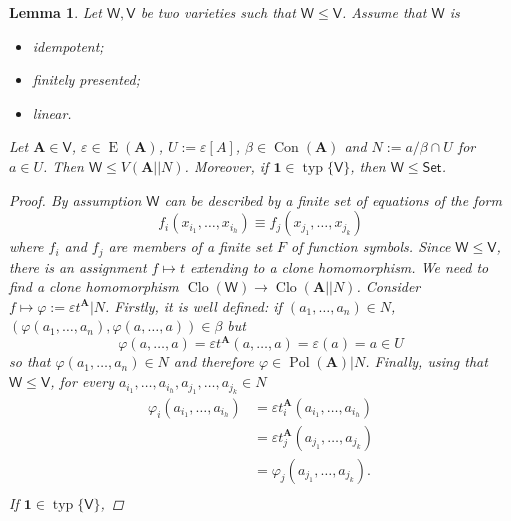 \documentclass{amsart}
\theoremstyle{plain}
\newtheorem{lemma}[theorem]{Lemma}
\theoremstyle{definition}
\theoremstyle{remark}
\def\phi{\varphi}
\def\epsilon{\varepsilon}
\DeclareMathOperator{\Clo}{Clo}
\DeclareMathOperator{\Con}{Con}
\DeclareMathOperator{\Pol}{Pol}
\DeclareMathOperator{\typ}{typ}
\DeclareMathOperator{\Id}{E}
\begin{document}
\begin{lemma}
    \label{lemma_type1}
    Let $\mathsf{W}, \mathsf{V}$ be two varieties such that $\mathsf{W} \le \mathsf{V}$. 
    Assume that $\mathsf{W}$ is 
    \begin{itemize}
        \item idempotent; 
        \item finitely presented; 
        \item linear. 
    \end{itemize}
    Let $\mathbf{A} \in \mathsf{V}$, $\epsilon \in \Id(\mathbf{A})$, $U:=\epsilon[A]$, $\beta \in \Con(\mathbf{A})$ and $N:=a/\beta \cap U$ for $a \in U$. 
    Then $\mathsf{W} \le V(\mathbf{A}||N)$. 
    Moreover, if $\mathbf{1} \in \typ\{\mathsf{V}\}$, then $\mathsf{W} \le \mathsf{Set}$. 
    \begin{proof}
        By assumption $\mathsf{W}$ can be described by a finite set of equations of the form 
        \begin{equation}
            f_i(x_{i_1}, \ldots, x_{i_h}) \equiv f_j(x_{j_1}, \ldots, x_{j_k})
        \end{equation}
        where $f_i$ and $f_j$ are members of a finite set $F$ of function symbols. 
        Since $\mathsf{W} \le  \mathsf{V}$, there is an assignment $f \mapsto t$ extending to a clone homomorphism. 
        We need to find a clone homomorphism $\Clo(\mathsf{W}) \to \Clo(\mathbf{A}||N)$. 
        Consider $f \mapsto \phi:=\epsilon t^\mathbf{A} |N$. 
        Firstly, it is well defined: if $(a_1, \ldots, a_n) \in N$, $(\phi(a_1, \ldots, a_n), \phi(a, \ldots, a)) \in \beta$ but 
        \begin{equation*}
            \phi(a, \ldots, a) = \epsilon t^\mathbf{A} (a, \ldots, a) = \epsilon(a)=a \in U
        \end{equation*}
        so that $\phi(a_1, \ldots, a_n) \in N$ and therefore $\phi \in \Pol(\mathbf{A})|N$. 
        Finally, using that $\mathsf{W} \le  \mathsf{V}$, for every $a_{i_1}, \ldots, a_{i_h},a_{j_1}, \ldots, a_{j_k} \in N$
        \begin{align*}
            \phi_i(a_{i_1}, \ldots, a_{i_h}) & = \epsilon t_i^\mathbf{A} (a_{i_1}, \ldots, a_{i_h}) \\
            & = \epsilon t_j^\mathbf{A} (a_{j_1}, \ldots, a_{j_k})\\
            & = \phi_j(a_{j_1}, \ldots, a_{j_k}) \text{.} \\
        \end{align*} 
        If $\mathbf{1} \in \typ\{\mathsf{V}\}$, 

\end{proof}
\end{lemma}
\end{document}
